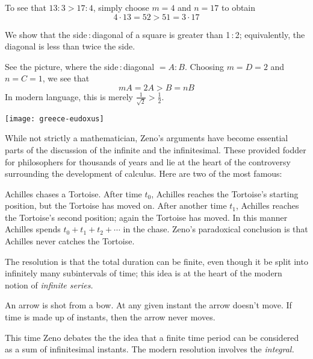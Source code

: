 \exstart To see that $13:3>17:4$, simply choose $m=4$ and $n=17$ to obtain
  \[4\cdot 13=52>51=3\cdot 17\]

\begin{enumerate}\setcounter{enumi}{1}
  \begin{minipage}[t]{0.68\linewidth}\vspace{-10pt}
    \item We show that the side\,:\,diagonal of a square is greater than 1\,:\,2; equivalently, the diagonal is less than twice the side.\par
    See the picture, where the side\,:\,diagonal $=A:B$. Choosing $m=D=2$ and $n=C=1$, we see that
  	\[
  		mA=2A>B=nB \tag{diag $>$ side of large square}
  	\]
  	In modern language, this is merely $\frac 1{\sqrt 2}>\frac 12$.
  \end{minipage}
  \hfill
  \begin{minipage}[t]{0.31\linewidth}\vspace{-10pt}
  	\flushright
  	\texttt{[image: greece-eudoxus]}
  \end{minipage}
\end{enumerate}


\label{pg:zeno}

While not strictly a mathematician, Zeno's arguments have become essential parts of the discussion of the infinite and the infinitesimal. These provided fodder for philosophers for thousands of years and lie at the heart of the controversy surrounding the development of calculus. Here are two of the most famous:
\begin{description}\itemsep0pt
  \item[\normalfont\emph{Achilles and Tortoise}] Achilles chases a Tortoise. After time $t_0$, Achilles reaches the Tortoise's starting position, but the Tortoise has moved on. After another time $t_1$, Achilles reaches the Tortoise's second position; again the Tortoise has moved. In this manner Achilles spends $t_0+t_1+t_2+\cdots$ in the chase. Zeno's paradoxical conclusion is that Achilles never catches the Tortoise.\par
  The resolution is that the total duration can be finite, even though it be split into infinitely many subintervals of time; this idea is at the heart of the modern notion of \emph{infinite series.}
  \item[\normalfont\emph{Arrow paradox}] An arrow is shot from a bow. At any given instant the arrow doesn't move. If time is made up of instants, then the arrow never moves.\par
  This time Zeno debates the the idea that a finite time period can be considered as a sum of infinitesimal instants. The modern resolution involves the \emph{integral.}
\end{description}


